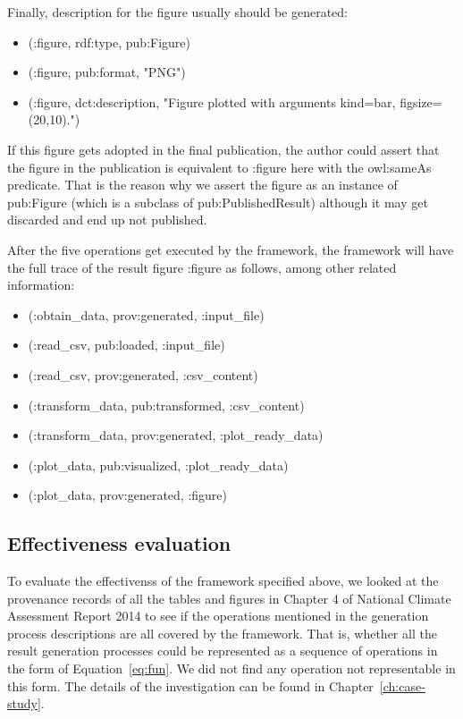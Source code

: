 Finally, description for the figure usually should be generated:
\begin{itemize}
	\item (:figure, rdf:type, pub:Figure)
	\item (:figure, pub:format, "PNG")
	\item (:figure, dct:description, "Figure plotted with arguments kind=bar, figsize=(20,10).")
\end{itemize}
If this figure gets adopted in the final publication, the author could assert that the figure in the publication is equivalent to :figure here with the owl:sameAs predicate. That is the reason why we assert the figure as an instance of pub:Figure (which is a subclass of pub:PublishedResult) although it may get discarded and end up not published.

After the five operations get executed by the framework, the framework will have the full trace of the result figure :figure as follows, among other related information:
\begin{itemize}
	\item (:obtain\_data, prov:generated, :input\_file)
	\item (:read\_csv, pub:loaded, :input\_file)
	\item (:read\_csv, prov:generated, :csv\_content)
	\item (:transform\_data, pub:transformed, :csv\_content)
	\item (:transform\_data, prov:generated, :plot\_ready\_data)
	\item (:plot\_data, pub:visualized, :plot\_ready\_data)
	\item (:plot\_data, prov:generated, :figure)
\end{itemize}

\subsection{Effectiveness evaluation}
To evaluate the effectivenss of the framework specified above, we looked at the provenance records of all the tables and figures in Chapter 4 of National Climate Assessment Report 2014 to see if the operations mentioned in the generation process descriptions are all covered by the framework. That is, whether all the result generation processes could be represented as a sequence of operations in the form of Equation~\ref{eq:fun}. We did not find any operation not representable in this form. The details of the investigation can be found in Chapter~\ref{ch:case-study}.

